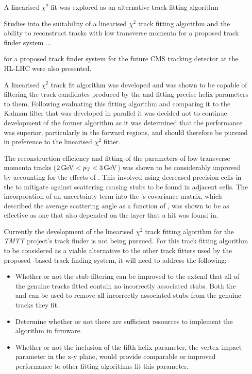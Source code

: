 A linearised $\chi^{2}$ fit was explored as an alternative track fitting algorithm

Studies into the suitability of a linearised $\chi^{2}$ track fitting algorithm and the ability to reconstruct tracks with low transverse momenta for a proposed track finder system ...

 for a proposed track finder system for the future CMS tracking detector at the HL-LHC were also presented.

A linearised $\chi^{2}$ track fit algorithm was developed and was shown to be capable of filtering the track candidates produced by the \HT and fitting precise helix parameters to them.
Following evaluating this fitting algorithm and comparing it to the Kalman filter that was developed in parallel it was decided not to continue development of the former algorithm as it was determined that the \KF performance was superior, particularly in the forward regions, and should therefore be pursued in preference to the linearised $\chi^{2}$ fitter.

The reconstruction efficiency and fitting of the parameters of low transverse momenta tracks ($2\,\text{Ge\hspace{-.08em}V} < p_{\mathrm{T}} < 3\,\text{Ge\hspace{-.08em}V}$) was shown to be considerably improved by accounting for the effects of \MS.
This involved using decreased precision cells in the \HT to mitigate against scattering causing stubs to be found in adjacent \HT cells.
The incorporation of an uncertainty term into the \KF's covariance matrix, which described the average scattering angle as a function of \pT, was shown to be as effective as one that also depended on the layer that a hit was found in.

Currently the development of the linearised $\chi^{2}$ track fitting algorithm for the \emph{TMTT} project's track finder is not being pursued.
For this track fitting algorithm to be considered as a viable alternative to the other track fitters used by the proposed \HT-based track finding system, it will need to address the following:

\begin{itemize}
\item Whether or not the stub filtering can be improved to the extend that all of the genuine tracks fitted contain no incorrectly associated stubs. Both the \KF and \LR can be used to remove all incorrectly associated stubs from the genuine tracks they fit. 
\item Determine whether or not there are sufficient resources to implement the algorithm in firmware.
\item Whether or not the inclusion of the fifth helix parameter, the vertex impact parameter in the x-y plane, would provide comparable or improved performance to other fitting algorithms fit this parameter.
\end{itemize}

